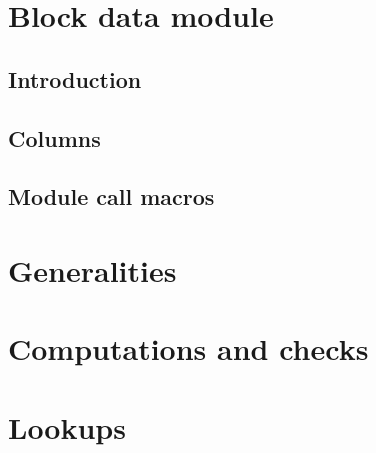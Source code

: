 

\section{Block data module}
\subsection{Introduction}                \label{block data: intro}                     
\subsection{Columns}                     \label{block data: columns}                   
\subsection{Module call macros}          \label{block data: module calls}              

\section{Generalities}                   \label{block data: generalities}              

\section{Computations and checks}        \label{block data: computations and checks}   

\section{Lookups}                        \label{block data: lookups}                   

